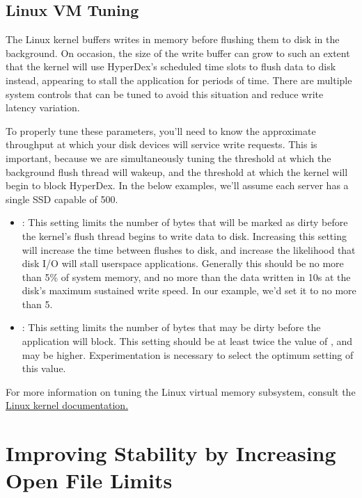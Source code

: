 \subsection{Linux VM Tuning}

The Linux kernel buffers writes in memory before flushing them to disk in the
background.  On occasion, the size of the write buffer can grow to such an
extent that the kernel will use HyperDex's scheduled time slots to flush data to
disk instead, appearing to stall the application for periods of time.  There are
multiple system controls that can be tuned to avoid this situation and reduce
write latency variation.

To properly tune these parameters, you'll need to know the approximate
throughput at which your disk devices will service write requests.  This is
important, because we are simultaneously tuning the threshold at which the
background flush thread will wakeup, and the threshold at which the kernel will
begin to block HyperDex.  In the below examples, we'll assume each server has a
single SSD capable of \unit{500}{\mega\byte\per\second}.

\begin{itemize}
    \item {}:  This setting limits the number
        of bytes that will be marked as dirty before the kernel's flush thread
        begins to write data to disk.  Increasing this setting will increase the
        time between flushes to disk, and increase the likelihood that disk I/O
        will stall userspace applications.  Generally this should be no more
        than 5\% of system memory, and no more than the data written in 10s at
        the disk's maximum sustained write speed.  In our example, we'd set it
        to no more than \unit{5}{\giga\byte}.
    \item {}:  This setting limits the number of bytes
        that may be dirty before the application will block.  This setting
        should be at least twice the value of
        , and may be higher.  Experimentation
        is necessary to select the optimum setting of this value.
\end{itemize}

For more information on tuning the Linux virtual memory subsystem, consult the
\href{https://www.kernel.org/doc/Documentation/sysctl/vm.txt}{Linux kernel documentation.}

\section{Improving Stability by Increasing Open File Limits}

